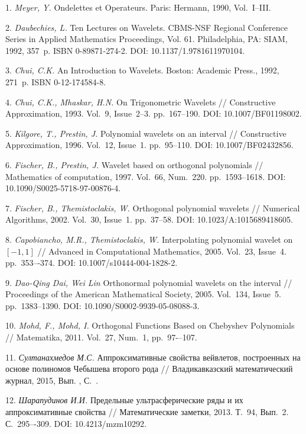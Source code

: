 \documentclass[12pt]{book}
\begin{document}
\begin{Rtwocolbib}%

1. \textit{Meyer, Y.} Ondelettes et Operateurs. Paris: Hermann, 1990, Vol.~I–III.

2. \textit{Daubechies, L.} Ten Lectures on Wavelets. CBMS-NSF Regional Conference Series in Applied Mathematics Proceedings,
Vol. 61. Philadelphia, PA: SIAM, 1992, 357~p. ISBN 0-89871-274-2. DOI: 10.1137/1.9781611970104.

3. \textit{Chui, C.K.} An Introduction to  Wavelets. Boston: Academic Press., 1992, 271~p. ISBN 0-12-174584-8.

4. \textit{Chui, C.K., Mhaskar, H.N.} On Trigonometric Wavelets // Constructive Approximation, 1993. Vol.~9, Issue~2--3. pp.~167--190. DOI: 10.1007/BF01198002.

5. \textit{Kilgore, T., Prestin, J.} Polynomial wavelets on an interval // Constructive Approximation, 1996. Vol.~12, Issue~1. pp.~95--110. DOI: 10.1007/BF02432856.

6. \textit{Fischer, B., Prestin, J.} Wavelet based on orthogonal polynomials // Mathematics of computation, 1997. Vol.~66, Num.~220. pp.~1593--1618. DOI: 10.1090/S0025-5718-97-00876-4.

7. \textit{Fischer, B., Themistoclakis, W.} Orthogonal polynomial wavelets // Numerical Algorithms, 2002. Vol.~30, Issue~1. pp.~37--58. DOI: 10.1023/A:1015689418605.

8. \textit{Capobiancho, M.R., Themistoclakis, W.} Interpolating polynomial wavelet on $[-1,1]$ // Advanced in Computational Mathematics, 2005. Vol.~23, Issue~4. pp.~353–-374. DOI: 10.1007/s10444-004-1828-2.

9. \textit{Dao-Qing Dai, Wei Lin} Orthonormal polynomial wavelets on the interval // Proceedings of the American Mathematical Society, 2005. Vol.~134, Issue~5. pp.~1383–1390. DOI: 10.1090/S0002-9939-05-08088-3.

10. \textit{Mohd, F., Mohd, I.} Orthogonal Functions Based on Chebyshev Polynomials // Matematika, 2011. Vol.~27, Num.~1, pp.~97-–107.

11. \textit{Султанахмедов М.С.} Аппроксимативные свойства вейвлетов, построенных на основе полиномов Чебышева второго рода // Владикавказский математический журнал, 2015, Вып. , С.~.

12. \textit{Шарапудинов И.И.} Предельные ультрасферические ряды и их аппроксимативные свойства // Математические заметки, 2013. Т.~94, Вып.~2. С.~295–-309. DOI: 10.4213/mzm10292.


\end{Rtwocolbib}
\end{document}
